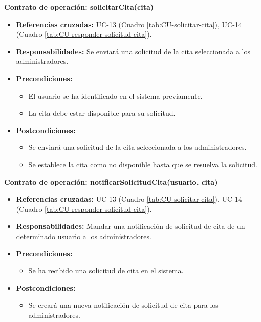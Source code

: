 \textbf{Contrato de operación: solicitarCita(cita)}
\begin{itemize}
\item \textbf{Referencias cruzadas:} UC-13 (Cuadro \ref{tab:CU-solicitar-cita}), UC-14 (Cuadro \ref{tab:CU-responder-solicitud-cita}).
\item \textbf{Responsabilidades:} Se enviará una solicitud de la cita seleccionada a los administradores.
\item \textbf{Precondiciones:} 
 \begin{itemize}
\item El usuario se ha identificado en el sistema previamente.
\item La cita debe estar disponible para su solicitud.
\end {itemize}
\item \textbf{Postcondiciones:} 
 \begin{itemize}
\item Se enviará una solicitud de la cita seleccionada a los administradores.
\item Se establece la cita como no disponible hasta que se resuelva la solicitud.
\end {itemize}
\end {itemize}

\textbf{Contrato de operación: notificarSolicitudCita(usuario, cita)}
\begin{itemize}
\item \textbf{Referencias cruzadas:} UC-13 (Cuadro \ref{tab:CU-solicitar-cita}), UC-14 (Cuadro \ref{tab:CU-responder-solicitud-cita}).
\item \textbf{Responsabilidades:} Mandar una notificación de solicitud de cita de un determinado usuario a los administradores.
\item \textbf{Precondiciones:} 
 \begin{itemize}
\item Se ha recibido una solicitud de cita en el sistema.
\end {itemize}
\item \textbf{Postcondiciones:} 
 \begin{itemize}
\item Se creará una nueva notificación de solicitud de cita para los administradores.
\end {itemize}
\end {itemize}

